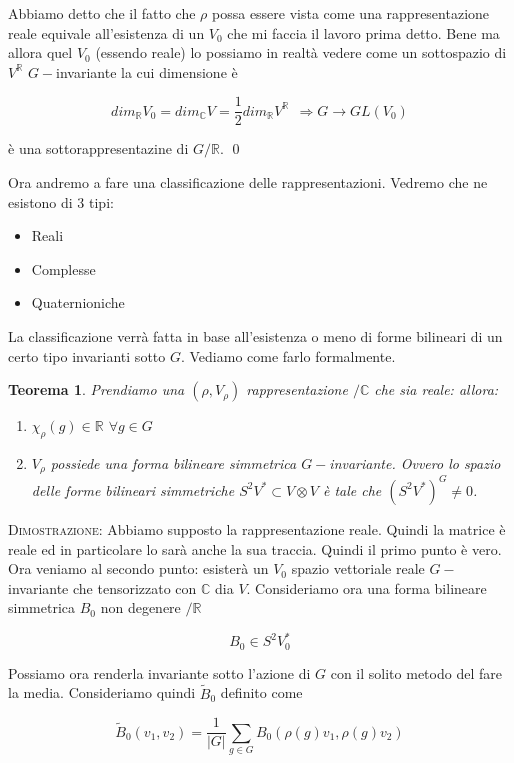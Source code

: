 \documentclass[11pt]{article}
\theoremstyle{plain}
\newtheorem{thm}{Teorema}[section]
\theoremstyle{definition}
\theoremstyle{remark}
\newcommand{\C}{\mathbb{C}}
\newcommand{\R}{\mathbb{R}}
\newcommand{\dsum}{\displaystyle\sum}
\begin{document}
Abbiamo detto che il fatto che $\rho$ possa essere vista come una rappresentazione reale equivale all'esistenza di un $V_0$ che mi faccia  il lavoro prima detto. Bene ma allora quel $V_0$ (essendo reale) lo possiamo in realtà vedere come un sottospazio di $V^{\R}$ $G-$invariante la cui dimensione è 

\[dim_\R V_0=dim_\C V=\frac{1}{2}dim_{\R} V^{\R}\ \ \Rightarrow G\rightarrow GL(V_0) \]

è una sottorappresentazine di $G/\R$.  \qed

Ora andremo a fare una classificazione delle rappresentazioni. Vedremo che ne esistono di 3 tipi:
\begin{itemize}
\item Reali
\item Complesse
\item Quaternioniche
\end{itemize}



La classificazione verrà fatta in base all'esistenza o meno di forme bilineari di un certo tipo invarianti sotto $G$. Vediamo come farlo formalmente.


\begin{thm}

Prendiamo una $(\rho, V_\rho)$ rappresentazione $/\C$ che sia reale: allora:
\begin{enumerate}
\item $\chi_\rho(g)\in \R$ $\forall g\in G$ 
\item $V_\rho$ possiede una forma bilineare simmetrica $G-$invariante. Ovvero lo spazio delle forme bilineari simmetriche $S^2V^*\subset V\otimes V$ è tale che $(S^2V^*)^G\neq 0$.
\end{enumerate} 

\end{thm}

\textsc{Dimostrazione:} Abbiamo supposto la rappresentazione reale. Quindi la matrice è reale ed in particolare lo sarà anche la sua traccia. Quindi il primo punto è vero. Ora veniamo al secondo punto: esisterà un $V_0$ spazio vettoriale reale $G-$invariante che tensorizzato con $\C$ dia $V$. Consideriamo ora una forma bilineare simmetrica $B_0$ non degenere $/\R$

\[ B_0 \in S^2 V_0^*\]

Possiamo ora renderla invariante sotto l'azione di $G$ con il solito metodo del fare la media. Consideriamo quindi $\tilde B_0$ definito come


\[ \tilde B_0(v_1, v_2) = \dfrac{1}{|G|} \dsum_{g\in G} B_0(\rho(g) v_1, \rho(g) v_2)\]
\end{document}
